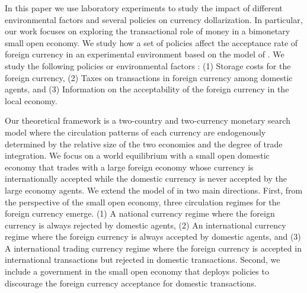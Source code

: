 

In this paper we use laboratory experiments to study the impact of different environmental factors and several policies on currency dollarization. In particular, our work focuses on exploring the transactional role of money in a bimonetary small open economy. We study how a set of policies affect the acceptance rate of foreign currency in an experimental environment based on the model of
\cite{MKM}. We study the following policies or environmental factors :
(1) Storage costs for the foreign currency, 
(2) Taxes on transactions in foreign currency among domestic agents, 
and (3) Information on the acceptability of the foreign currency in the local economy.

Our theoretical framework is a two-country and two-currency monetary search model where the circulation patterns of each currency are endogenously determined by the relative size of the two economies and the degree of trade integration. We focus on a world equilibrium with a small open domestic economy that trades with a large foreign economy whose currency is internationally accepted while the domestic currency is never accepted by the large economy agents. We extend the model of \cite{MKM} in two main directions. First, from the perspective of the small open economy, three circulation regimes for the  foreign currency emerge. (1) A national currency regime where the foreign currency is always rejected by domestic agents, (2) An international currency regime where the foreign currency is always accepted by domestic agents, and (3) A international trading currency regime where the foreign currency is accepted in international transactions but rejected in domestic transactions. Second, we include a government in the small open economy that deploys policies to discourage the  foreign currency acceptance for domestic transactions.  

